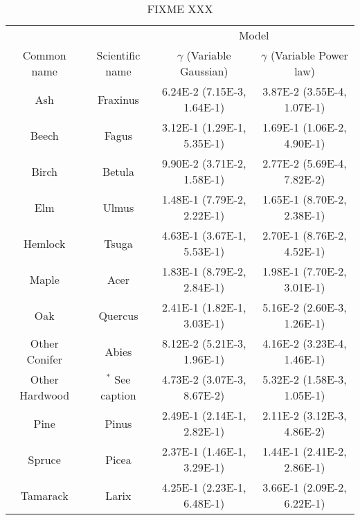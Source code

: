 \begin{table}
\begin{center}
\begin{tabular}{cccc} 
\toprule
               &                 & \multicolumn{2}{c}{Model} \\
Common name    & Scientific name & $\gamma$ (Variable Gaussian) & $\gamma$ (Variable Power law) \\  \midrule
           Ash & Fraxinus        & 6.24E-2 (7.15E-3, 1.64E-1)   & 3.87E-2 (3.55E-4, 1.07E-1)    \\
         Beech & Fagus           & 3.12E-1 (1.29E-1, 5.35E-1)   & 1.69E-1 (1.06E-2, 4.90E-1)    \\
         Birch & Betula          & 9.90E-2 (3.71E-2, 1.58E-1)   & 2.77E-2 (5.69E-4, 7.82E-2)    \\
           Elm & Ulmus           & 1.48E-1 (7.79E-2, 2.22E-1)   & 1.65E-1 (8.70E-2, 2.38E-1)    \\
       Hemlock & Tsuga           & 4.63E-1 (3.67E-1, 5.53E-1)   & 2.70E-1 (8.76E-2, 4.52E-1)    \\
         Maple & Acer            & 1.83E-1 (8.79E-2, 2.84E-1)   & 1.98E-1 (7.70E-2, 3.01E-1)    \\
           Oak & Quercus         & 2.41E-1 (1.82E-1, 3.03E-1)   & 5.16E-2 (2.60E-3, 1.26E-1)    \\
 Other Conifer & Abies           & 8.12E-2 (5.21E-3, 1.96E-1)   & 4.16E-2 (3.23E-4, 1.46E-1)    \\
Other Hardwood & $^{*}$ See caption    & 4.73E-2 (3.07E-3, 8.67E-2)   & 5.32E-2 (1.58E-3, 1.05E-1)    \\
          Pine & Pinus           & 2.49E-1 (2.14E-1, 2.82E-1)   & 2.11E-2 (3.12E-3, 4.86E-2)    \\
        Spruce & Picea           & 2.37E-1 (1.46E-1, 3.29E-1)   & 1.44E-1 (2.41E-2, 2.86E-1)    \\
      Tamarack & Larix           & 4.25E-1 (2.23E-1, 6.48E-1)   & 3.66E-1 (2.09E-2, 6.22E-1)    \\ \bottomrule
\end{tabular}
\caption{FIXME XXX}
\end{center}
\label{table:gamma}
\vspace{2cm}
\end{table}


